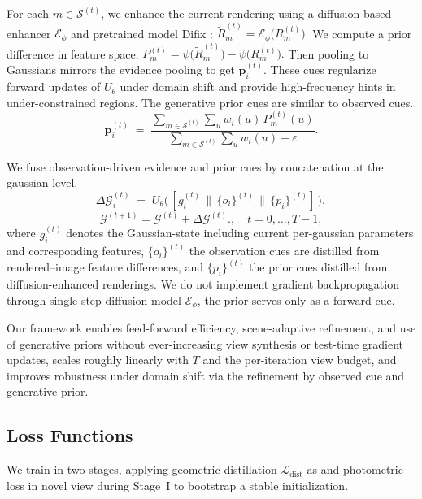 For each $m\in\mathcal{S}^{(t)}$, we enhance the current rendering using a diffusion-based enhancer $\mathcal{E}_\phi$ and pretrained model Difix \cite{wu2025difix3d+}: $\tilde{R}_m^{(t)}=\mathcal{E}_\phi\!\big(R_m^{(t)}\big).$
We compute a prior difference in feature space: $P_m^{(t)}=\psi\!\big(\tilde{R}_m^{(t)}\big)-\psi\!\big(R_m^{(t)}\big).$ Then pooling to Gaussians mirrors the evidence pooling to get $\mathbf{p}_i^{(t)}$. These cues regularize forward updates of $U_\theta$ under domain shift and provide high-frequency hints in under-constrained regions. The generative prior cues are similar to observed cues.
\begin{equation}
\mathbf{p}_i^{(t)} \;=\;
\frac{\sum_{m\in\mathcal{S}^{(t)}}\sum_{u} w_i(u)\,P_m^{(t)}(u)}
     {\sum_{m\in\mathcal{S}^{(t)}}\sum_{u} w_i(u)+\varepsilon}.
\end{equation}

We fuse observation-driven evidence and prior cues by concatenation at the gaussian level.
\begin{equation}
\Delta \mathcal{G}_i^{(t)} \;=\; U_\theta\big(\,[g_i^{(t)} \,\|\, \{o_i\}^{(t)} \,\|\, \{p_i\}^{(t)}]\,\big),
\end{equation}
\begin{equation}
    \mathcal{G}^{(t+1)}=\mathcal{G}^{(t)}+\Delta\mathcal{G}^{(t)}.,\quad t=0,\dots,T-1,
\end{equation}
where $g_i^{(t)}$ denotes the Gaussian-state including current per-gaussian parameters and corresponding features, $\{o_i\}^{(t)}$ the observation cues are distilled from rendered–image feature differences, and $\{p_i\}^{(t)}$ the prior cues distilled from diffusion-enhanced renderings. We do not implement gradient backpropagation through single-step diffusion model $\mathcal{E}_\phi$, the prior serves only as a forward cue. 

Our framework enables feed-forward efficiency, scene-adaptive refinement, and use of generative priors without ever-increasing view synthesis or test-time gradient updates, scales roughly linearly with $T$ and the per-iteration view budget, and improves robustness under domain shift via the refinement by observed cue and generative prior. 


\subsection{Loss Functions}
\label{sec:loss}

We train in two stages, applying geometric
distillation $\mathcal{L}_{\mathrm{dist}}$ as \cite{jiang2025anysplat} and photometric loss in novel view during Stage~I to bootstrap a stable initialization.

